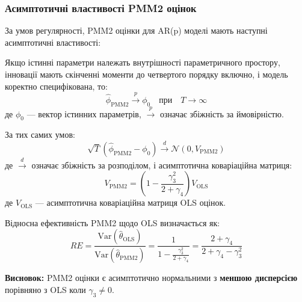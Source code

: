\subsubsection{Асимптотичні властивості PMM2 оцінок}
\label{subsubsec:pmm2_asymptotic}

За умов регулярності, PMM2 оцінки для AR(p) моделі мають наступні асимптотичні властивості:

\begin{theorem}[Спроможність]
\label{thm:consistency}
Якщо істинні параметри належать внутрішності параметричного простору, інновації мають скінченні моменти до четвертого порядку включно, і модель коректно специфікована, то:
\begin{equation}
\hat{\phi}_{\text{PMM2}} \xrightarrow{p} \phi_0 \quad \text{при} \quad T \to \infty
\end{equation}
де $\phi_0$ --- вектор істинних параметрів, $\xrightarrow{p}$ означає збіжність за ймовірністю.
\end{theorem}

\begin{theorem}
\label{thm:asymptotic_normality}
За тих самих умов:
\begin{equation}
\label{eq:asymptotic_distribution}
\sqrt{T}(\hat{\phi}_{\text{PMM2}} - \phi_0) \xrightarrow{d} \mathcal{N}(0, V_{\text{PMM2}})
\end{equation}
де $\xrightarrow{d}$ означає збіжність за розподілом, і асимптотична коваріаційна матриця:
\begin{equation}
\label{eq:asymptotic_variance}
V_{\text{PMM2}} = \left(1 - \frac{\gamma_3^2}{2 + \gamma_4}\right) V_{\text{OLS}}
\end{equation}
де $V_{\text{OLS}}$ --- асимптотична коваріаційна матриця OLS оцінок.
\end{theorem}

\begin{corollary}
\label{cor:relative_efficiency}
Відносна ефективність PMM2 щодо OLS визначається як:
\begin{equation}
\label{eq:relative_efficiency_detailed}
RE = \frac{\text{Var}(\hat{\theta}_{\text{OLS}})}{\text{Var}(\hat{\theta}_{\text{PMM2}})} = \frac{1}{1 - \frac{\gamma_3^2}{2+\gamma_4}} = \frac{2 + \gamma_4}{2 + \gamma_4 - \gamma_3^2}
\end{equation}
\end{corollary}

\noindent \textbf{Висновок:} PMM2 оцінки є асимптотично нормальними з \textbf{меншою дисперсією} порівняно з OLS коли $\gamma_3 \neq 0$.

